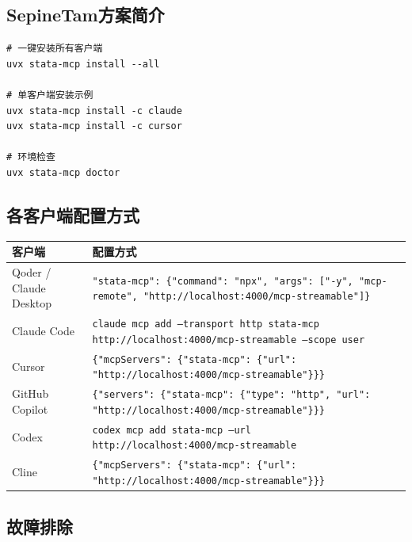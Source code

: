 \subsection{SepineTam方案简介}

\begin{lstlisting}[style=shell]
# 一键安装所有客户端
uvx stata-mcp install --all

# 单客户端安装示例
uvx stata-mcp install -c claude
uvx stata-mcp install -c cursor

# 环境检查
uvx stata-mcp doctor
\end{lstlisting}

\subsection{各客户端配置方式}

\begin{table}[H]
\centering
\begin{tabular}{lp{8cm}}
\toprule
\textbf{客户端} & \textbf{配置方式} \\
\midrule
Qoder / Claude Desktop & \texttt{"stata-mcp": \{"command": "npx", "args": ["-y", "mcp-remote", "http://localhost:4000/mcp-streamable"]\}} \\
Claude Code & \texttt{claude mcp add --transport http stata-mcp http://localhost:4000/mcp-streamable --scope user} \\
Cursor & \texttt{\{"mcpServers": \{"stata-mcp": \{"url": "http://localhost:4000/mcp-streamable"\}\}\}} \\
GitHub Copilot & \texttt{\{"servers": \{"stata-mcp": \{"type": "http", "url": "http://localhost:4000/mcp-streamable"\}\}\}} \\
Codex & \texttt{codex mcp add stata-mcp --url http://localhost:4000/mcp-streamable} \\
Cline & \texttt{\{"mcpServers": \{"stata-mcp": \{"url": "http://localhost:4000/mcp-streamable"\}\}\}} \\
\bottomrule
\end{tabular}
\end{table}

\subsection{故障排除}

